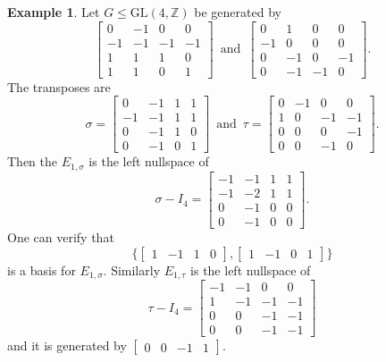 \documentclass{article}
\theoremstyle{plain}
\theoremstyle{definition}
\newtheorem{example}[theorem]{Example}
\newcommand{\Z}{\ensuremath{\mathbb{Z}}}
\newcommand{\tand}{\ensuremath{\,\,\, \text{and} \,\,\,}}
\begin{document}
\begin{example}
Let $G\leq \mathrm{GL}(4,\Z)$ be generated by 
$$ \left[ \begin {array}{cccc} 0&-1&0&0\\ -1&-1&-1&-1
\\ 1&1&1&0\\ 1&1&0&1\end {array}
 \right] 
\tand
\left[ \begin {array}{cccc} 0&1&0&0\\ -1&0&0&0
\\ 0&-1&0&-1\\ 0&-1&-1&0
\end {array} \right].
$$
The transposes are 
$$
 \sigma = \left[ \begin {array}{cccc} 0&-1&1&1\\ -1&-1&1&1
\\ 0&-1&1&0\\ 0&-1&0&1\end {array}
 \right]
 \tand 
\tau =  \left[ \begin {array}{cccc} 0&-1&0&0\\ 1&0&-1&-1
\\ 0&0&0&-1\\ 0&0&-1&0\end {array}
 \right].
$$ 
Then the $E_{1,\sigma}$ is the left nullspace of 
$$\sigma - I_4 = \left[ \begin {array}{cccc} -1&-1&1&1\\ -1&-2&1&1 \\ 0&-1&0&0\\ 0&-1&0&0\end {array}\right].$$
One can verify that 
\begin{displaymath}
\lbrace \begin{bmatrix}
1& -1 &1 &0
\end{bmatrix}, \begin{bmatrix}
1& -1 &0 &1
\end{bmatrix}
\rbrace
\end{displaymath}
is a basis for $E_{1,\sigma}$. Similarly $E_{1,\tau}$ is the left nullspace of 
$$\tau - I_4 = \left[ \begin {array}{cccc} -1&-1&0&0\\ 1&-1&-1&-1
\\ 0&0&-1&-1\\ 0&0&-1&-1\end {array}
 \right]$$ and it is generated by $\begin{bmatrix}
0& 0 &-1 &1
\end{bmatrix}$.\\

\end{example}
\end{document}
